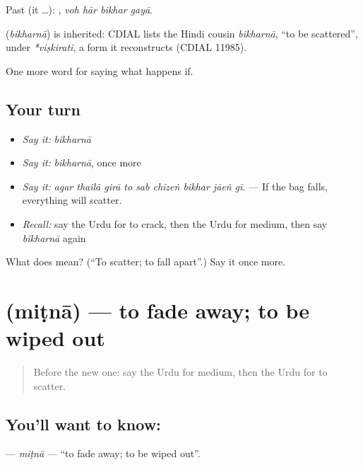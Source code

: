 Past (it …):    , \emph{voh hār bikhar gayā}.

\begin{cousinweb}
\textbf{} (\emph{bikharnā}) is inherited: CDIAL lists the Hindi cousin \emph{bikharnā}, \textquotedblleft{}to be scattered\textquotedblright{}, under \emph{*viṣkirati}, a form it reconstructs (CDIAL 11985).
\end{cousinweb}

\begin{grammarlens}[title={What you've built}]
One more word for saying what happens if.
\end{grammarlens}

\subsection*{Your turn}
\begin{itemize}
\raggedright
  \item \emph{Say it:} \emph{bikharnā}
  \item \emph{Say it:} \emph{bikharnā}, once more
  \item \emph{Say it:} \emph{agar thailā girā to sab chīzeṅ bikhar jāeṅ gī.} — If the bag falls, everything will scatter.
  \item \emph{Recall:} say the Urdu for to crack, then the Urdu for medium, then say \emph{bikharnā} again
\end{itemize}

\begin{tcolorbox}[breakable,colback=teal!4,colframe=teal!35!black,title={Before you move on}]
What does  mean? (\textquotedblleft{}To scatter; to fall apart\textquotedblright{}.) Say it once more.
\end{tcolorbox}
\section[\texorpdfstring{\ur{مٹنا} (miṭnā)}{مٹنا (miṭnā)}]{ (miṭnā) — to fade away; to be wiped out}

\label{lesson:UR-C373-mitna}



\begin{quote}
Before the new one: say the Urdu for medium, then the Urdu for to scatter.
\end{quote}

\subsection*{You'll want to know: }
\textbf{} — \emph{miṭnā} — \textquotedblleft{}to fade away; to be wiped out\textquotedblright{}.

